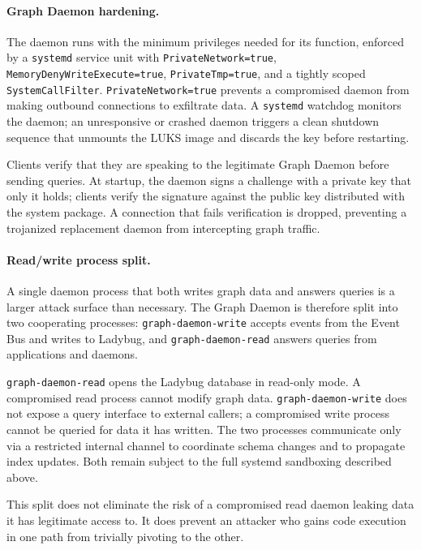 \paragraph{Graph Daemon hardening.}
The daemon runs with the minimum privileges needed for its function, enforced
by a \texttt{systemd} service unit with \texttt{PrivateNetwork=true},
\texttt{MemoryDenyWriteExecute=true}, \texttt{PrivateTmp=true}, and a tightly
scoped \texttt{SystemCallFilter}. \texttt{PrivateNetwork=true} prevents a
compromised daemon from making outbound connections to exfiltrate data.
A \texttt{systemd} watchdog monitors the daemon; an unresponsive or crashed
daemon triggers a clean shutdown sequence that unmounts the LUKS image and
discards the key before restarting.

Clients verify that they are speaking to the legitimate Graph Daemon before
sending queries. At startup, the daemon signs a challenge with a private key
that only it holds; clients verify the signature against the public key
distributed with the system package. A connection that fails verification is
dropped, preventing a trojanized replacement daemon from intercepting graph
traffic.

\paragraph{Read/write process split.}
\label{sec:graph-daemon-split}
A single daemon process that both writes graph data and answers queries is a
larger attack surface than necessary. The Graph Daemon is therefore split into
two cooperating processes: \texttt{graph-daemon-write} accepts events from the
Event Bus and writes to Ladybug, and \texttt{graph-daemon-read} answers queries
from applications and daemons.

\texttt{graph-daemon-read} opens the Ladybug database in read-only mode. A
compromised read process cannot modify graph data. \texttt{graph-daemon-write}
does not expose a query interface to external callers; a compromised write
process cannot be queried for data it has written. The two processes communicate
only via a restricted internal channel to coordinate schema changes and to
propagate index updates. Both remain subject to the full systemd sandboxing
described above.

This split does not eliminate the risk of a compromised read daemon leaking
data it has legitimate access to. It does prevent an attacker who gains
code execution in one path from trivially pivoting to the other.

